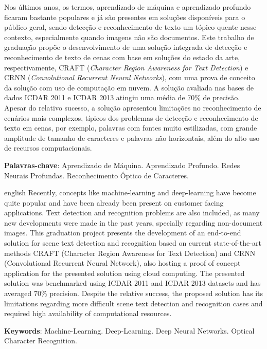 
\setlength{\absparsep}{18pt} %
\begin{resumo}
Nos últimos anos, os termos, aprendizado de máquina e aprendizado profundo ficaram bastante populares e já são 
presentes em soluções disponíveis para o público geral, sendo detecção e reconhecimento de texto um tópico 
quente nesse contexto, especialmente quando imagens não são documentos.
Este trabalho de graduação propõe o desenvolvimento de uma solução integrada de detecção e reconhecimento 
de texto de cenas com base em soluções do estado da arte, respectivamente, CRAFT (\textit{Character Region Awareness for Text Detection}) 
e CRNN (\textit{Convolutional Recurrent Neural Networks}), com uma prova de conceito da solução com uso de computação em nuvem.
A solução avaliada nas bases de dados ICDAR 2011 e ICDAR 2013 atingiu uma média de 70\% de precisão. 
Apesar do relativo sucesso, a solução apresentou limitações no reconhecimento de cenários mais complexos, típicos 
dos problemas de detecção e reconhecimento de texto em cenas, por exemplo, palavras com fontes muito estilizadas, 
com grande amplitude de tamanho de caracteres e palavras não horizontais, além do alto uso de recursos computacionais.

 \textbf{Palavras-chave}: Aprendizado de Máquina. Aprendizado Profundo. Redes Neurais Profundas. Reconhecimento Óptico de Caracteres.
\end{resumo}

\begin{resumo}[Abstract]
 \begin{otherlanguage*}{english}
   Recently, concepts like machine-learning and deep-learning have become quite popular and have been already been 
   present on customer facing applications. Text detection and recognition problems are also included, as many new 
   developments were made in the past years, specially regarding non-document images.
   This graduation project presents the development of an end-to-end solution for scene text detection and recognition 
   based on current state-of-the-art methods CRAFT (Character Region Awareness for Text Detection) and CRNN 
   (Convolutional Recurrent Neural Network), also hosting a proof of concept application for the presented solution using cloud computing. 
   The presented solution was benchmarked using ICDAR 2011 and ICDAR 2013 datasets and has averaged 70\% precision. Despite the 
   relative success, the proposed solution has its limitations regarding more difficult scene text detection and recognition 
   cases and required high availability of computational resources.

   \vspace{\onelineskip}
 
   \noindent 
   \textbf{Keywords}: Machine-Learning. Deep-Learning. Deep Neural Networks. Optical Character Recognition.
 \end{otherlanguage*}
\end{resumo}